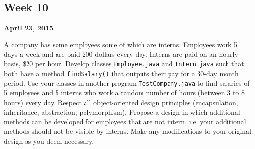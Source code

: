 \documentclass[12pt,letterpaper,twoside]{article}
\begin{document}


\subsection*{Week 10}
\hfill \textbf{April 23, 2015}

A company has some employees some of which are interns. Employees work 5 days a week and are paid 200 dollars every day. Interns are paid on an hourly basis, \$20 per hour. Develop classes \texttt{Employee.java} and \texttt{Intern.java} such that both have a method \texttt{findSalary()} that outputs their pay for a 30-day month period. Use your classes in another program \texttt{TestCompany.java} to find salaries of 5 employees and 5 interns who work a random number of hours (between 3 to 8 hours) every day. Respect all object-oriented design principles (encapsulation, inheritance, abstraction, polymorphism).
Propose a design in which additional methods can be developed for employees that are not intern, i.e. your additional methods should not be visible by interns. Make any modifications to your original design as you deem necessary.
\end{document}
